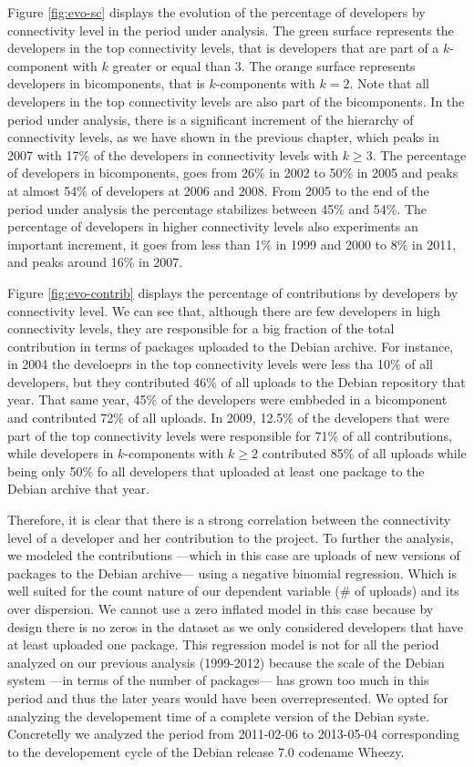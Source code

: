 Figure \ref{fig:evo-sc} displays the evolution of the percentage of developers by connectivity level in the period under analysis. The green surface represents the developers in the top connectivity levels, that is developers that are part of a $k$-component with $k$ greater or equal than 3. The orange surface represents developers in bicomponents, that is $k$-components with $k=2$. Note that all developers in the top connectivity levels are also part of the bicomponents. In the period under analysis, there is a significant increment of the hierarchy of connectivity levels, as we have shown in the previous chapter, which peaks in 2007 with 17\% of the developers in connectivity levels with $k \ge 3$. The percentage of developers in bicomponents, goes from 26\% in 2002 to 50\% in 2005 and peaks at almost 54\% of developers at 2006 and 2008. From 2005 to the end of the period under analysis the percentage stabilizes between 45\% and 54\%. The percentage of developers in higher connectivity levels also experiments an important increment, it goes from less than 1\% in 1999 and 2000 to 8\% in 2011, and peaks around 16\% in 2007.

Figure \ref{fig:evo-contrib} displays the percentage of contributions by developers by connectivity level. We can see that, although there are few developers in high connectivity levels, they are responsible for a big fraction of the total contribution in terms of packages uploaded to the Debian archive. For instance, in 2004 the develoeprs in the top connectivity levels were less tha 10\% of all developers, but they contributed 46\% of all uploads to the Debian repository that year. That same year, 45\% of the developers were embbeded in a bicomponent and contributed 72\% of all uploads. In 2009, 12.5\% of the developers that were part of the top connectivity levels were responsible for 71\% of all contributions, while developers in $k$-components with $k \ge 2$ contributed 85\% of all uploads while being only 50\% fo all developers that uploaded at least one package to the Debian archive that year. 

Therefore, it is clear that there is a strong correlation between the connectivity level of a developer and her contribution to the project. To further the analysis, we modeled the contributions ---which in this case are uploads of new versions of packages to the Debian archive--- using a negative binomial regression. Which is well suited for the count nature of our dependent variable (\# of uploads) and its over dispersion. We cannot use a zero inflated model in this case because by design there is no zeros in the dataset as we only considered developers that have at least uploaded one package. This regression model is not for all the period analyzed on our previous analysis (1999-2012) because the scale of the Debian system ---in terms of the number of packages--- has grown too much in this period and thus the later years would have been overrepresented. We opted for analyzing the developement time of a complete version of the Debian syste. Concretelly we analyzed the period from 2011-02-06 to 2013-05-04  corresponding to the developement cycle of the Debian release 7.0 codename Wheezy.

